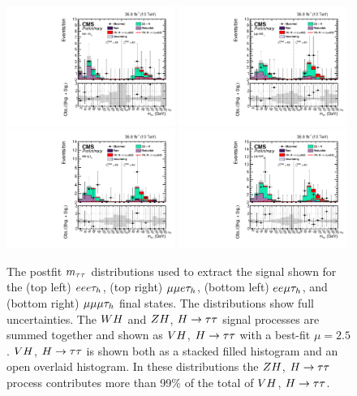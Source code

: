 \begin{figure}[h!]
 \begin{center}
  \includegraphics[width=0.49\textwidth]{higgs_to_taus_vh/plots/zh/eeet_postfit.pdf}
  \includegraphics[width=0.49\textwidth]{higgs_to_taus_vh/plots/zh/emmt_postfit.pdf}
  \includegraphics[width=0.49\textwidth]{higgs_to_taus_vh/plots/zh/eemt_postfit.pdf}
  \includegraphics[width=0.49\textwidth]{higgs_to_taus_vh/plots/zh/mmmt_postfit.pdf}
 \end{center}
 \caption{The postfit $m_{\tau\tau}$ distributions used to extract the signal shown
  for the (top left) $eee\tau_{h}$, (top right) $\mu\mu e\tau_{h}$, 
  (bottom left) $ee\mu\tau_{h}$, and (bottom right) $\mu\mu\mu\tau_{h}$
  final states. The distributions show full uncertainties.
  The $WH$ and $ZH$, $H\to\tau\tau$ signal processes are summed together and 
  shown as $VH$, $H\to\tau\tau$ with a best-fit $\mu = 2.5$. $VH$, $H\to\tau\tau$ is shown both as 
  a stacked filled histogram and an open overlaid histogram. In these distributions 
  the $ZH$, $H\to\tau\tau$ process contributes more than 99\% of the total of $VH$, $H\to\tau\tau$.
 }
 \label{fig:zh_all_eight1}
\end{figure}


